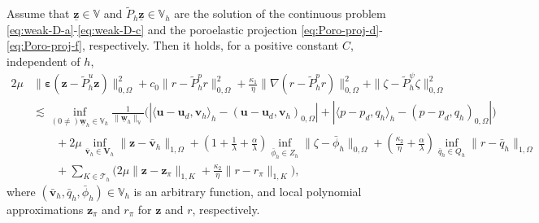 \documentclass[smallextended]{svjour3}
\numberwithin{equation}{section}
\numberwithin{figure}{section}
\numberwithin{table}{section}
\newcommand\bV{\mathbf{V}}
\newcommand\beps{\boldsymbol{\varepsilon}}
\newcommand{\tP}{\tilde{P}}
\newcommand\buw{\underline{\boldsymbol{w}}}
\newcommand\buz{\underline{\boldsymbol{z}}}
\newcommand\bu{\boldsymbol{u}}
\newcommand\bv{\boldsymbol{v}}
\newcommand\bz{\boldsymbol{z}}
\newcommand\cT{\mathcal{T}}
\newcommand{\bbV}{\mathbb{V}}
\begin{document}
\begin{lemma} \label{lem:dis-proj-t}
	Assume that $\buz \in \bbV$ and $\tP_h \buz \in \bbV_h$ are the solution of the continuous problem \eqref{eq:weak-D-a}-\eqref{eq:weak-D-c} and the poroelastic projection \eqref{eq:Poro-proj-d}-\eqref{eq:Poro-proj-f}, respectively. Then it holds, for a positive constant $C$, independent of $h$,
    \begin{align*}
		2 \mu & \| \beps(\bz - \tP_h^u \bz) \|_{0, \Omega}^2  + c_0 \| r - \tP_h^p r \|_{0, \Omega}^2 +  \frac{\kappa_1}{\eta} \| \nabla (r - \tP_h^p r)\|_{0, \Omega}^2+ \| \zeta - \tP_h^{\psi} \zeta \|_{0, \Omega}^2 \\
        & \lesssim  \inf_{(0 \neq)\buw_h \in \bbV_h}\frac{1}{\|\buw_h\|_{\bbV}} \Big( |\langle \bu - \bu_d, \bv_h \rangle_h -  (\bu - \bu_d, \bv_h)_{0, \Omega}|  + |\langle p - p_d, q_h \rangle_h -  (p - p_d, q_h)_{0, \Omega}| \Big) \\
        & \qquad + 2 \mu \inf_{\bar{\bv}_h \in \bV_h} \| \bz - \bar{\bv}_h\|_{1, \Omega} + \left( 1 + \frac{1}{\lambda} + \frac{\alpha}{\lambda} \right) \inf_{\bar{\phi}_h \in Z_h} \|\zeta -\bar{\phi}_h\|_{0, \Omega}+  \left(  \frac{\kappa_2}{\eta} + \frac{\alpha}{\lambda} \right) \inf_{\bar{q}_h \in Q_h}  \| r- \bar{q}_h \|_{1, \Omega}  \\
        & \qquad + \sum_{K \in \cT_h} \Big( 2 \mu\|\bz - \bz_{\pi} \|_{1, K}  + \frac{\kappa_2}{\eta} \|r- r_{\pi}\|_{1, K} \Big),
    \end{align*}
    where $(\bar{\bv}_h, \bar{q}_h, \bar{\phi}_h) \in \bbV_h$ is an arbitrary function, and local polynomial approximations $\bz_{\pi}$ and $r_{\pi}$ for $\bz$ and $r$, respectively.
\end{lemma}
\end{document}
